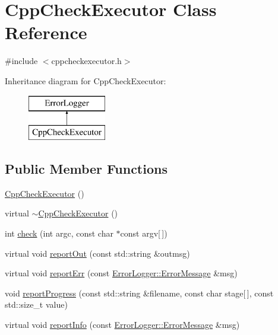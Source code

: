 \hypertarget{class_cpp_check_executor}{\section{Cpp\-Check\-Executor Class Reference}
\label{class_cpp_check_executor}
}


{\ttfamily \#include $<$cppcheckexecutor.\-h$>$}

Inheritance diagram for Cpp\-Check\-Executor\-:\begin{figure}[H]
\begin{center}
\leavevmode
\includegraphics[height=2.000000cm]{class_cpp_check_executor}
\end{center}
\end{figure}
\subsection*{Public Member Functions}
\begin{DoxyCompactItemize}
\item 
\hyperlink{class_cpp_check_executor_ae1c2b7d162accc886fb0facbd4cd1b38}{Cpp\-Check\-Executor} ()
\item 
virtual \hyperlink{class_cpp_check_executor_add7f54e2456c6b60c67408265f9e747b}{$\sim$\-Cpp\-Check\-Executor} ()
\item 
int \hyperlink{class_cpp_check_executor_a9006ccb8322dc7c2f87591788e31f4fe}{check} (int argc, const char $\ast$const argv\mbox{[}$\,$\mbox{]})
\item 
virtual void \hyperlink{class_cpp_check_executor_a9b88a15cc0bff59ba3a15cf1d776ad44}{report\-Out} (const std\-::string \&outmsg)
\item 
virtual void \hyperlink{class_cpp_check_executor_ab26c1747073a7b61d0ce7142b6c550af}{report\-Err} (const \hyperlink{class_error_logger_1_1_error_message}{Error\-Logger\-::\-Error\-Message} \&msg)
\item 
void \hyperlink{class_cpp_check_executor_ad71f89d16696b672b2d76e419d154766}{report\-Progress} (const std\-::string \&filename, const char stage\mbox{[}$\,$\mbox{]}, const std\-::size\-\_\-t value)
\item 
virtual void \hyperlink{class_cpp_check_executor_ac22d5437dca278e53c60ea2a43d0a21b}{report\-Info} (const \hyperlink{class_error_logger_1_1_error_message}{Error\-Logger\-::\-Error\-Message} \&msg)
\end{DoxyCompactItemize}
